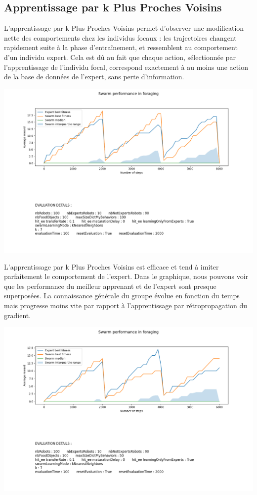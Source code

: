 \documentclass[a4paper, 12pt]{report}
\begin{document}
    \subsection{Apprentissage par k Plus Proches Voisins}
    L'apprentissage par k Plus Proches Voisins permet d'observer une modification nette des comportements chez les individus focaux : les trajectoires changent rapidement suite à la phase d'entraînement, et ressemblent au comportement d'un individu expert. Cela est dû au fait que chaque action, sélectionnée par l'apprentissage de l'individu focal, correspond exactement à au moins une action de la base de données de l'expert, sans perte d'information.
    
    
    \includegraphics[scale=0.5]{knn6000_100.png}
    
    L'apprentissage par k Plus Proches Voisins est efficace et tend à imiter parfaitement le comportement de l'expert.
    Dans le graphique, nous pouvons voir que les performance du meilleur apprenant et de l'expert sont presque superposées. La connaissance générale du groupe évolue en fonction du temps mais progresse moins vite par rapport à l'apprentissage par rétropropagation du gradient.
    
    \includegraphics[scale=0.5]{knn6000_50.png}
    
\end{document}
